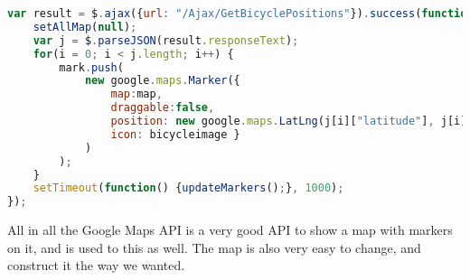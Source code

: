 \begin{minipage}{\textwidth}
\begin{lstlisting}[caption={Update the bicycles marker position}, label={lst:updatemarker}, language=Javascript]
var result = $.ajax({url: "/Ajax/GetBicyclePositions"}).success(function() {
	setAllMap(null);
	var j = $.parseJSON(result.responseText);
	for(i = 0; i < j.length; i++) {
		mark.push(
			new google.maps.Marker({ 
				map:map, 
				draggable:false, 
				position: new google.maps.LatLng(j[i]["latitude"], j[i]["longitude"]), 
				icon: bicycleimage }
			)
		);
	}
	setTimeout(function() {updateMarkers();}, 1000);
});
\end{lstlisting}
\end{minipage}

All in all the Google Maps API is a very good API to show a map with markers on it, and is used to this as well. 
The map is also very easy to change, and construct it the way we wanted.